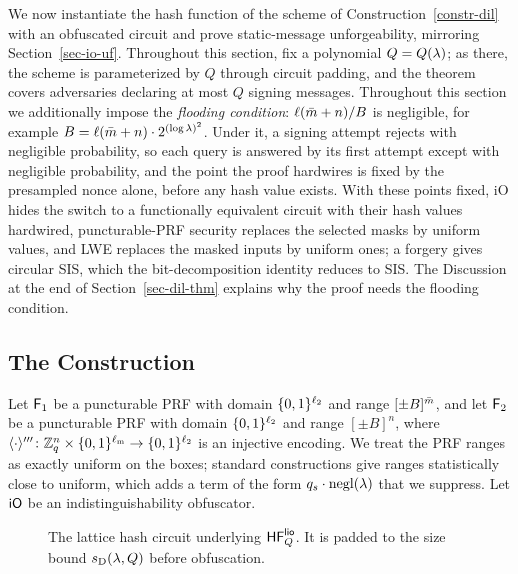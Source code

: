 We now instantiate the hash function of the scheme of Construction~\ref{constr-dil} with an obfuscated circuit and prove static-message unforgeability, mirroring Section~\ref{sec-io-uf}. Throughout this section, fix a polynomial $Q = Q(\lambda)$; as there, the scheme is parameterized by $Q$ through circuit padding, and the theorem covers adversaries declaring at most $Q$ signing messages. Throughout this section we additionally impose the \emph{flooding condition}: $\ell(\bar m+n)/B$ is negligible, for example $B = \ell(\bar m+n)\cdot 2^{(\log\lambda)^2}$. Under it, a signing attempt rejects with negligible probability, so each query is answered by its first attempt except with negligible probability, and the point the proof hardwires is fixed by the presampled nonce alone, before any hash value exists. With these points fixed, iO hides the switch to a functionally equivalent circuit with their hash values hardwired, puncturable-PRF security replaces the selected masks by uniform values, and LWE replaces the masked inputs by uniform ones; a forgery gives circular SIS, which the bit-decomposition identity reduces to SIS. The Discussion at the end of Section~\ref{sec-dil-thm} explains why the proof needs the flooding condition.

\subsection{The Construction} \label{sec-dil-constr}

Let $\mathsf{F}_1$ be a puncturable PRF with domain $\{0,1\}^{\ell_2}$ and range $[\pm B]^{\bar m}$, and let $\mathsf{F}_2$ be a puncturable PRF with domain $\{0,1\}^{\ell_2}$ and range $[\pm B]^{n}$, where $\langle \cdot \rangle''' \colon \mathbb{Z}_q^n \times \{0,1\}^{\ell_{\mathrm{m}}} \to \{0,1\}^{\ell_2}$ is an injective encoding. We treat the PRF ranges as exactly uniform on the boxes; standard constructions give ranges statistically close to uniform, which adds a term of the form $q_s \cdot \mathrm{negl}(\lambda)$ that we suppress. Let $\mathsf{iO}$ be an indistinguishability obfuscator.

\begin{figure}[t]
\begin{center}
\end{center}
\vspace{-6pt}
\caption{The lattice hash circuit underlying $\mathsf{HF}^{\mathsf{lio}}_Q$. It is padded to the size bound $s_{\mathrm{D}}(\lambda, Q)$ before obfuscation.}\label{fig-circuit-dil}
\vspace{-3pt}\hrulefill
\vspace{-1ex}
\end{figure}

